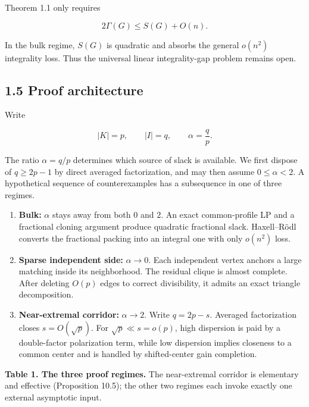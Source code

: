 \documentclass[
  11pt,
]{article}
\begin{document}
Theorem 1.1 only requires

\[
2\Gamma(G)\le S(G)+O(n).
\]

In the bulk regime, \(S(G)\) is quadratic and absorbs the general \(o(n^2)\) integrality loss. Thus the universal linear integrality-gap problem remains open.

\subsection{1.5 Proof architecture}\label{proof-architecture}

Write

\[
|K|=p,
\qquad
|I|=q,
\qquad
\alpha=\frac qp.
\]

The ratio \(\alpha=q/p\) determines which source of slack is available. We first dispose of \(q\ge2p-1\) by direct averaged factorization, and may then assume \(0\le\alpha<2\). A hypothetical sequence of counterexamples has a subsequence in one of three regimes.

\begin{enumerate}
\def\labelenumi{\arabic{enumi}.}
\item
  \textbf{Bulk:} \(\alpha\) stays away from both \(0\) and \(2\). An exact common-profile LP and a fractional cloning argument produce quadratic fractional slack. Haxell--Rödl converts the fractional packing into an integral one with only \(o(n^2)\) loss.
\item
  \textbf{Sparse independent side:} \(\alpha\to0\). Each independent vertex anchors a large matching inside its neighborhood. The residual clique is almost complete. After deleting \(O(p)\) edges to correct divisibility, it admits an exact triangle decomposition.
\item
  \textbf{Near-extremal corridor:} \(\alpha\to2\). Write \(q=2p-s\). Averaged factorization closes \(s=O(\sqrt p)\). For \(\sqrt p\ll s=o(p)\), high dispersion is paid by a double-factor polarization term, while low dispersion implies closeness to a common center and is handled by shifted-center gain completion.
\end{enumerate}

\textbf{Table 1. The three proof regimes.} The near-extremal corridor is elementary and effective (Proposition 10.5); the other two regimes each invoke exactly one external asymptotic input.
\end{document}
